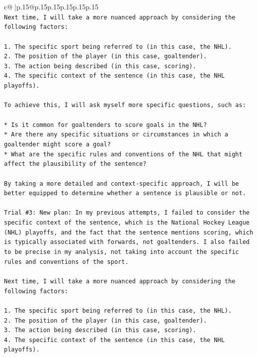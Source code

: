 \documentclass{article}
\begin{document}
{\begin{supertabular}{c@{$\;$}|p{.15\linewidth}@{}p{.15\linewidth}p{.15\linewidth}p{.15\linewidth}p{.15\linewidth}p{.15\linewidth}}
{{{\\ 
\texttt{Next time, I will take a more nuanced approach by considering the following factors:} \\
\\ 
\texttt{1. The specific sport being referred to (in this case, the NHL).} \\
\texttt{2. The position of the player (in this case, goaltender).} \\
\texttt{3. The action being described (in this case, scoring).} \\
\texttt{4. The specific context of the sentence (in this case, the NHL playoffs).} \\
\\ 
\texttt{To achieve this, I will ask myself more specific questions, such as:} \\
\\ 
\texttt{* Is it common for goaltenders to score goals in the NHL?} \\
\texttt{* Are there any specific situations or circumstances in which a goaltender might score a goal?} \\
\texttt{* What are the specific rules and conventions of the NHL that might affect the plausibility of the sentence?} \\
\\ 
\texttt{By taking a more detailed and context{-}specific approach, I will be better equipped to determine whether a sentence is plausible or not.} \\
\\ 
\texttt{Trial \#3: New plan: In my previous attempts, I failed to consider the specific context of the sentence, which is the National Hockey League (NHL) playoffs, and the fact that the sentence mentions scoring, which is typically associated with forwards, not goaltenders. I also failed to be precise in my analysis, not taking into account the specific rules and conventions of the sport.} \\
\\ 
\texttt{Next time, I will take a more nuanced approach by considering the following factors:} \\
\\ 
\texttt{1. The specific sport being referred to (in this case, the NHL).} \\
\texttt{2. The position of the player (in this case, goaltender).} \\
\texttt{3. The action being described (in this case, scoring).} \\
\texttt{4. The specific context of the sentence (in this case, the NHL playoffs).} \\
}}}
\end{supertabular}}
\end{document}
